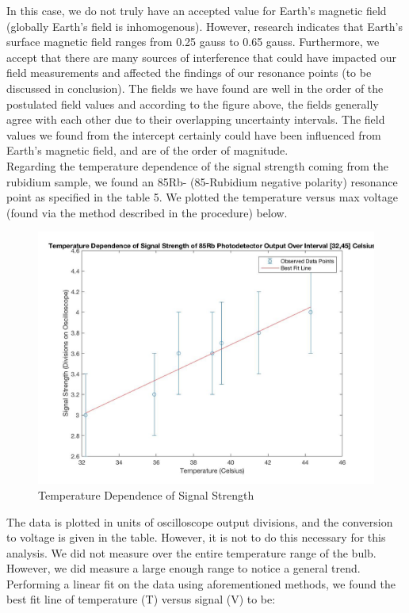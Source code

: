 \documentclass{article}
\begin{document}
\indent In this case, we do not truly have an accepted value for Earth's magnetic field (globally Earth's field is inhomogenous). However, research indicates that Earth's surface magnetic field ranges from 0.25 gauss to 0.65 gauss. \cite{earth}
Furthermore, we accept that there are many sources of interference that could have impacted our field measurements and affected the findings of our resonance points (to be discussed in conclusion). The fields we have found are well in the order of the postulated field values and according to the figure above, the fields generally agree with each other due to their overlapping uncertainty intervals. %
The field values we found from the intercept certainly could have been influenced from Earth's magnetic field, and are of the order of magnitude.
\\\indent Regarding the temperature dependence of the signal strength coming from the rubidium sample, we found an 85Rb- (85-Rubidium negative polarity) resonance point as specified in the table 5. We plotted the temperature versus max voltage (found via the method described in the procedure) below. 
\begin{figure}[H] %
        \centering
        \includegraphics[scale = 0.25]{4.jpg}
        \caption{Temperature Dependence of Signal Strength}
        \label{fig:my_label}
    \end{figure}
\indent The data is plotted in units of oscilloscope output divisions, and the conversion to voltage is given in the table. However, it is not to do this necessary for this analysis. We did not measure over the entire temperature range of the bulb. However, we did measure a large enough range to notice a general trend. Performing a linear fit on the data using aforementioned methods, we found the best fit line of temperature (T) versus signal (V) to be:
\end{document}
